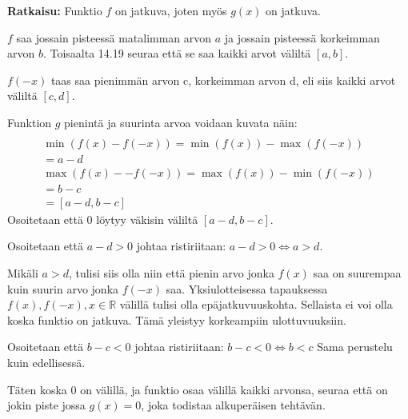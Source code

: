 \documentclass[12pt,a4paper,leqno]{amsart}
\begin{document}
\smallskip
\textbf{Ratkaisu: }
Funktio $f$ on jatkuva, joten myös $g(x)$ on jatkuva.

 $f$ saa jossain pisteessä matalimman arvon $a$ ja jossain pisteessä korkeimman arvon $b$. Toisaalta 14.19 seuraa että se saa kaikki arvot väliltä $[a, b]$. %

$f(-x)$ taas saa pienimmän arvon c, korkeimman arvon d, eli siis kaikki arvot väliltä $[c, d]$. 

Funktion $g$ pienintä ja suurinta arvoa voidaan kuvata näin:
\begin{align*}
    [\min(f(x) - f(-x)), \max(f(x) - -f(-x))] \\
    \min(f(x) - f(-x)) = \min(f(x)) - \max(f(-x)) \\
    = a - d \\
    \max(f(x) - -f(-x)) = \max(f(x)) - \min(f(-x)) \\
    = b - c\\
    = [a - d, b - c]
\end{align*}
Osoitetaan että 0 löytyy väkisin väliltä $[a-d, b-c]$.

Osoitetaan että $a - d > 0$ johtaa ristiriitaan: $a - d > 0 \iff a > d$.

Mikäli $a > d$, tulisi siis olla niin että pienin arvo jonka $f(x)$ saa on suurempaa kuin suurin arvo jonka $f(-x)$ saa. Yksiulotteisessa tapauksessa $f(x), f(-x), x \in \mathbb{R}$ välillä tulisi olla epäjatkuvuuskohta. Sellaista ei voi olla koska funktio on jatkuva. Tämä yleistyy korkeampiin ulottuvuuksiin.

Osoitetaan että $b - c < 0$ johtaa ristiriitaan: $b - c < 0 \iff b < c$ 
Sama perustelu kuin edellisessä.

Täten koska 0 on välillä, ja funktio osaa välillä kaikki arvonsa, seuraa että on jokin piste jossa $g(x) = 0$, joka todistaa alkuperäisen tehtävän.
\end{document}
